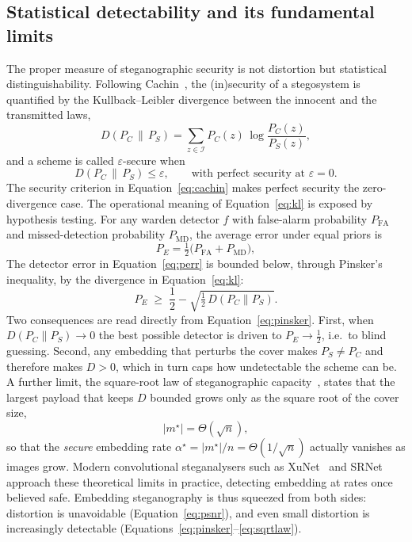 \documentclass[11pt]{article}
\theoremstyle{definition}
\newcommand{\Eqn}[1]{Equation~\eqref{#1}}
\newcommand{\Eqns}[2]{Equations~\eqref{#1}--\eqref{#2}}
\begin{document}
\subsection{Statistical detectability and its fundamental limits}\label{sec:security}
The proper measure of steganographic security is not distortion but statistical
distinguishability. Following Cachin~\cite{cachin}, the (in)security of a stegosystem is
quantified by the Kullback--Leibler divergence between the innocent and the
transmitted laws,
\begin{equation}
  D\!\left(P_C \,\|\, P_S\right)=\sum_{z\in\mathcal{I}} P_C(z)\,
        \log\frac{P_C(z)}{P_S(z)} ,
  \label{eq:kl}
\end{equation}
and a scheme is called $\varepsilon$-secure when
\begin{equation}
  D\!\left(P_C \,\|\, P_S\right)\le\varepsilon,
  \qquad\text{with perfect security at } \varepsilon=0 .
  \label{eq:cachin}
\end{equation}
The security criterion in \Eqn{eq:cachin} makes perfect security the zero-divergence
case. The operational meaning of \Eqn{eq:kl} is exposed by hypothesis testing. For any
warden detector $f$ with false-alarm probability $P_{\mathrm{FA}}$ and
missed-detection probability $P_{\mathrm{MD}}$, the average error under equal
priors is
\begin{equation}
  P_E=\tfrac{1}{2}\bigl(P_{\mathrm{FA}}+P_{\mathrm{MD}}\bigr),
  \label{eq:perr}
\end{equation}
The detector error in \Eqn{eq:perr} is bounded below, through Pinsker's inequality,
by the divergence
in \Eqn{eq:kl}:
\begin{equation}
  P_E \;\ge\; \frac{1}{2}-\sqrt{\tfrac{1}{2}\,D\!\left(P_C\|P_S\right)} .
  \label{eq:pinsker}
\end{equation}
Two consequences are read directly from \Eqn{eq:pinsker}. First, when
$D\!\left(P_C\|P_S\right)\to 0$ the best possible detector is driven to
$P_E\to\tfrac12$, i.e.\ to blind guessing. Second, any embedding that perturbs the
cover makes $P_S\neq P_C$ and therefore makes $D>0$, which in turn caps how
undetectable the scheme can be. A further limit, the square-root law of
steganographic capacity~\cite{kerSqrt}, states that the largest payload that keeps $D$ bounded
grows only as the square root of the cover size,
\begin{equation}
  |m^\star| = \Theta\!\left(\sqrt{n}\right),
  \label{eq:sqrtlaw}
\end{equation}
so that the \emph{secure} embedding rate $\alpha^\star=|m^\star|/n=\Theta(1/\sqrt
n)$ actually vanishes as images grow. Modern convolutional steganalysers such as
XuNet~\cite{xu2016} and SRNet~\cite{boroumand2019} approach these theoretical
limits in practice, detecting embedding at rates once believed safe. Embedding
steganography is thus squeezed from both sides: distortion is unavoidable
(\Eqn{eq:psnr}), and even small distortion is increasingly detectable
(\Eqns{eq:pinsker}{eq:sqrtlaw}).
\end{document}
